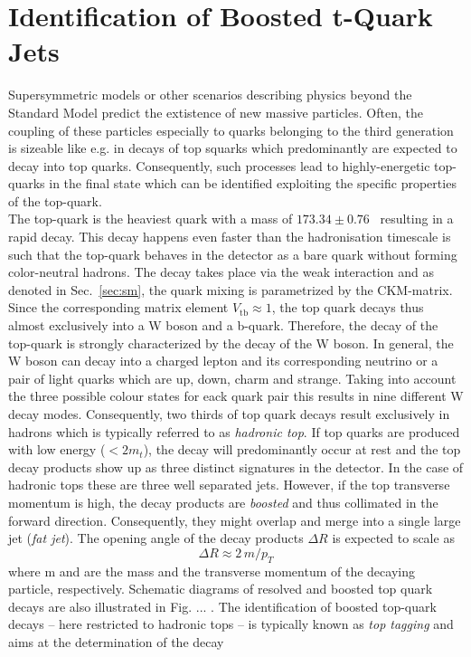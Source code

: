 \section{Identification of Boosted t-Quark Jets }
\label{sec:boosted_tops}
Supersymmetric models or other scenarios describing physics beyond the Standard Model predict the extistence of new massive particles. Often, the coupling of these particles especially to quarks belonging to the third generation is sizeable like e.g. in decays of top squarks which predominantly are expected to decay into top quarks. Consequently, such processes lead to highly-energetic top-quarks in the final state which can be identified exploiting the specific properties of the top-quark. \\
The top-quark is the heaviest quark with a mass of $173.34 \pm 0.76$\gev~\cite{ATLAS:2014wva} resulting in a rapid decay. This decay happens even faster than the hadronisation timescale is such that the top-quark behaves in the detector as a bare quark without forming color-neutral hadrons. The decay takes place via the weak interaction and as denoted in Sec.~\ref{sec:sm}, the quark mixing is parametrized by the CKM-matrix. Since the corresponding matrix element $V_{\mathrm{tb}} \approx 1$, the top quark decays thus almost exclusively into a W boson and a b-quark. Therefore, the decay of the top-quark is strongly characterized by the decay of the W boson. In general, the W boson can decay into a charged lepton and its corresponding neutrino or a pair of light quarks which are up, down, charm and strange. Taking into account the three possible colour states for eack quark pair this results in nine different W decay modes. Consequently, two thirds of top quark decays result exclusively in hadrons which is typically referred to as \textit{hadronic top}. If top quarks are produced with low energy ($< 2 m_{t}$), the decay will predominantly occur at rest and the top decay products show up as three distinct signatures in the detector. In the case of hadronic tops these are three well separated jets. However, if the top transverse momentum is high, the decay products are \textit{boosted} and thus collimated in the forward direction. Consequently, they might overlap and merge into a single large jet (\textit{fat jet}). The opening angle of the decay products $\Delta R$ is expected to scale as
\begin{equation}
 \Delta R \approx 2\,m /p_{T}
\end{equation}  
where m and \pt are the mass and the transverse momentum of the decaying particle, respectively. Schematic diagrams of resolved and boosted top quark decays are also illustrated in Fig. ... . The identification of boosted top-quark decays -- here restricted to hadronic tops -- is typically known as \textit{top tagging} and aims at the determination of the decay
